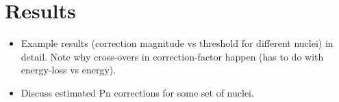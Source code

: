 \section{Results}
  \begin{itemize}
    \item Example results (correction magnitude vs threshold for
  different nuclei) in detail. Note why cross-overs in
  correction-factor happen (has to do with energy-loss vs energy).
    \item Discuss estimated Pn corrections for some set of nuclei.
  \end{itemize}
